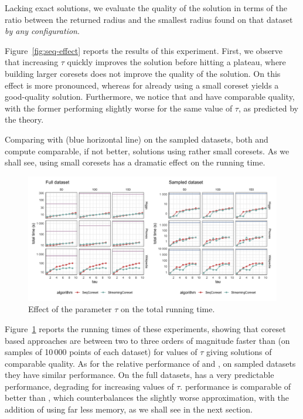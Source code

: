 Lacking exact solutions,
we evaluate the quality of the solution in terms of the ratio between the returned radius
and the smallest radius found on that dataset \emph{by any configuration}.

Figure~\ref{fig:seq-effect} reports the results of this experiment.
First, we observe that increasing $\tau$ quickly improves the solution before hitting a plateau, where
building larger coresets does not improve the quality of the solution.
On \higgs this effect is more pronounced, whereas for \wiki already using a small coreset yields a good-quality solution.
Furthermore, we notice that \stream and \seq have comparable quality, 
with the former performing slightly 
worse for the same value of $\tau$, as predicted by the theory.

Comparing with \chen (blue horizontal line) on the sampled datasets, both \seq and \stream compute comparable, 
if not better, solutions using rather small coresets.
As we shall see,
using small coresets has a dramatic effect on the running time.

\begin{figure}
    \includegraphics[width=\textwidth]{seq-time}
    \caption{
        \label{fig:seq-time}
        Effect of the parameter $\tau$ on the total running time.
    }
\end{figure}
Figure~\ref{fig:seq-time} reports the running times of these experiments,
showing that coreset based approaches are between two to three orders of magnitude faster than \chen
(on samples of 10\,000 points of each dataset) for values of $\tau$ giving solutions of comparable quality.
As for the relative performance of \seq and \stream, on sampled datasets they have similar performance.
On the full datasets, \seq has a very predictable performance, degrading for increasing values 
of $\tau$.
\stream performance is comparable of better than \seq, which counterbalances the slightly worse
approximation, with the addition of using far less memory, as we shall see in the next section.

